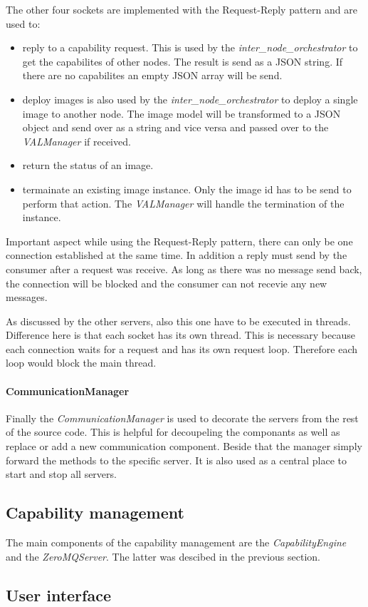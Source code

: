 The other four sockets are implemented with the Request-Reply pattern and are used to:
\begin{itemize}
  \item reply to a capability request.
  This is used by the \textit{inter\_node\_orchestrator} to get the capabilites of other nodes.
  The result is send as a \ac{JSON} string.
  If there are no capabilites an empty \ac{JSON} array will be send.
  \item deploy images is also used by the \textit{inter\_node\_orchestrator} to deploy a single image to another node.
  The image model will be transformed to a \ac{JSON} object and send over as a string and vice versa and passed over to the \textit{VALManager} if received.
  \item return the status of an image. 
  \item termainate an existing image instance.
  Only the image id has to be send to perform that action.
  The \textit{VALManager} will handle the termination of the instance.
\end{itemize}
Important aspect while using the Request-Reply pattern, there can only be one connection established at the same time.
In addition a reply must send by the consumer after a request was receive.
As long as there was no message send back, the connection will be blocked and the consumer can not recevie any new messages.

As discussed by the other servers, also this one have to be executed in threads.
Difference here is that each socket has its own thread.
This is necessary because each connection waits for a request and has its own request loop.
Therefore each loop would block the main thread.

\paragraph{CommunicationManager}
Finally the \textit{CommunicationManager} is used to decorate the servers from the rest of the source code.
This is helpful for decoupeling the componants as well as replace or add a new communication component.
Beside that the manager simply forward the methods to the specific server.
It is also used as a central place to start and stop all servers.

\subsection{Capability management}
The main components of the capability management are the \textit{CapabilityEngine} and the \textit{ZeroMQServer}.
The latter was descibed in the previous section.


\subsection{User interface}
\doit

